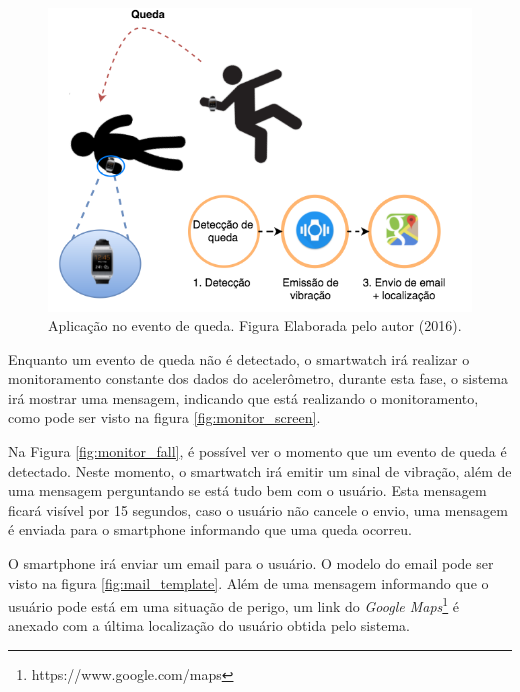 \begin{figure}[ht]
	\centering
	\includegraphics[scale=0.5]{imagens/DiagramaQueda.png}
	\caption{Aplicação no evento de queda. Figura Elaborada pelo autor (2016).}
	\label{fig:diagram}
\end{figure}

Enquanto um evento de queda não é detectado, o smartwatch irá realizar o monitoramento constante dos dados do acelerômetro, durante esta fase, o sistema irá mostrar uma mensagem, indicando que está realizando o monitoramento, como pode ser visto na figura \ref{fig:monitor_screen}.


Na Figura \ref{fig:monitor_fall}, é possível ver o momento que um evento de queda é detectado. Neste momento, o smartwatch irá emitir um sinal de vibração, além de uma mensagem perguntando se está tudo bem com o usuário. Esta mensagem ficará visível por 15 segundos, caso o usuário não cancele o envio, uma mensagem é enviada para o smartphone informando que uma queda ocorreu.


O smartphone irá enviar um email para o usuário. O modelo do email pode ser visto na figura \ref{fig:mail_template}. Além de uma mensagem informando que o usuário pode está em uma situação de perigo, um link do \textit{Google Maps}\footnote{https://www.google.com/maps} é anexado com a última localização do usuário obtida pelo sistema. 


